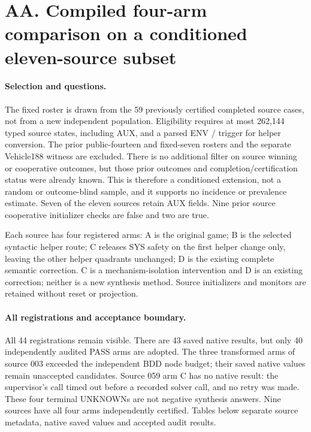 \clearpage
\section*{AA. Compiled four-arm comparison on a conditioned eleven-source subset}
\label{supp:compiled-cohort}
\paragraph{Selection and questions.}
The fixed roster is drawn from the 59 previously certified completed
source cases, not from a new independent population. Eligibility requires
at most 262,144 typed source states, including AUX, and a parsed ENV
/ trigger for helper conversion. The prior
public-fourteen and fixed-seven rosters and the separate Vehicle188 witness
are excluded. There is no additional filter on source winning or cooperative
outcomes, but those prior outcomes and completion/certification status were
already known. This is therefore a conditioned extension, not a random or
outcome-blind sample, and it supports no incidence or prevalence estimate.
Seven of the eleven sources retain AUX fields. Nine prior source
cooperative initializer checks are false and two are true.

Each source has four registered arms: A is the original game; B is the
selected syntactic helper route; C releases SYS safety on the first helper
change only, leaving the other helper quadrants unchanged; D is the existing
complete semantic correction. C is a mechanism-isolation intervention and
D is an existing correction; neither is a new synthesis method. Source
initializers and monitors are retained without reset or projection.

\paragraph{All registrations and acceptance boundary.}
All 44 registrations remain visible. There are 43 saved native results,
but only 40 independently audited PASS arms are adopted. The three
transformed arms of source 003 exceeded the independent BDD node budget;
their saved native values remain unaccepted candidates. Source 059 arm C
has no native result: the supervisor's  call timed out before a
recorded solver call, and no retry was made. These four terminal UNKNOWNs
are not negative synthesis answers. Nine sources have all four arms
independently certified. Tables below separate source metadata, native
saved values and accepted audit results.

